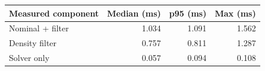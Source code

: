 \begin{tabular}{lrrr}
\toprule
Measured component & Median (ms) & p95 (ms) & Max (ms) \\
\midrule
Nominal + filter & 1.034 & 1.091 & 1.562 \\
Density filter & 0.757 & 0.811 & 1.287 \\
Solver only & 0.057 & 0.094 & 0.108 \\
\bottomrule
\end{tabular}
